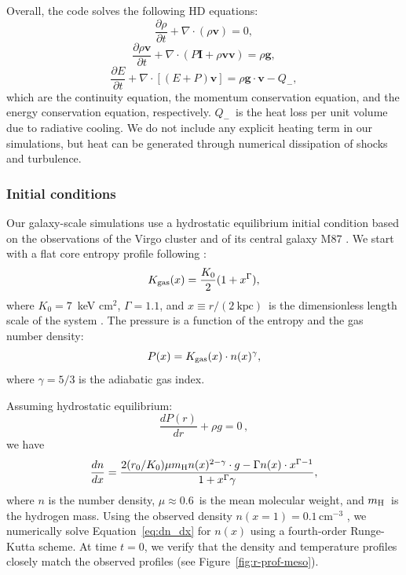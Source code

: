 Overall, the code solves the following HD equations:
\begin{equation}
    \frac{\partial \rho}{\partial t} + \nabla \cdot (\rho \mathbf{v}) = 0,
\end{equation}
\begin{equation}
    \frac{\partial \rho \mathbf{v}}{\partial t} + \nabla \cdot (P \mathbf{I} + \rho \mathbf{v} \mathbf{v}) = \rho \mathbf{g},
\end{equation}
\begin{equation}
    \frac{\partial E}{\partial t} + \nabla \cdot [(E+P)\mathbf{v}] = \rho \mathbf{g} \cdot \mathbf{v} - Q_{-},
\end{equation}
which are the continuity equation, the momentum conservation equation, and the energy conservation equation, respectively.
$Q_{-}$\ is the heat loss per unit volume due to radiative cooling.
We do not include any explicit heating term in our simulations, but heat can be generated through numerical dissipation of shocks and turbulence.


\subsubsection{Initial conditions} \label{subsec:init}

Our galaxy-scale simulations use a hydrostatic equilibrium initial condition based on the observations of the Virgo cluster \citep{urban_x-ray_2011} and of its central galaxy M87 \citep{russell_inside_2015}.
We start with a flat core entropy profile following \citet{martizzi_simulations_2019}:
\begin{equation}
\label{eq:entropy}
    K_{\rm gas}(x) = \frac{K_0}{2}(1+x^{\Gamma}),
\end{equation}
where $K_{0}=7$~keV cm$^2$, $\Gamma = 1.1$, and $x \equiv r/(2~\mathrm{kpc})$~is the dimensionless length scale of the system \citep{urban_x-ray_2011}.
The pressure is a function of the entropy and the gas number density:
\begin{equation}
\label{eq:pressure}
    P(x) = K_{\rm gas}(x) \cdot n(x)^{\gamma},
\end{equation}
where $\gamma = 5/3$ is the adiabatic gas index.

Assuming hydrostatic equilibrium:
\begin{equation}
    \frac{dP(r)}{dr} + \rho g = 0\, ,
\end{equation}
we have
\begin{equation}
\label{eq:dn_dx}
    \frac{dn}{dx} = \frac{2 (r_0 / K_0) \mu m_{\rm H} n(x)^{2-\gamma} \cdot g - \Gamma n(x) \cdot x^{\Gamma - 1} }{1+x^{\Gamma}\gamma},
\end{equation}
where $n$ is the number density, $\mu \approx 0.6$\ is the mean molecular weight, and $m_{\rm H}$\ is the hydrogen mass.
Using the observed density $n(x=1)=0.1\,\mathrm{cm}^{-3}$ \citep{russell_inside_2015}, we numerically solve Equation~\ref{eq:dn_dx} for $n(x)$ using a fourth-order Runge-Kutta scheme.
At time $t= 0$, we verify that the density and temperature profiles closely match the observed profiles (see Figure~\ref{fig:r-prof-meso}).

